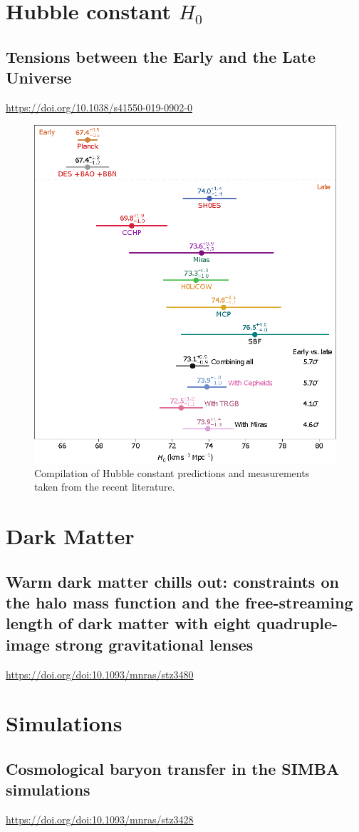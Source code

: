 \section{Hubble constant $H_0$}

\subsection*{Tensions between the Early and the Late Universe}
\url{https://doi.org/10.1038/s41550-019-0902-0}
\begin{figure}[H]
    \centering
    \includegraphics[width=.85 \textwidth]{Pictures/99/Tensions.eps}
    \caption{Compilation of Hubble constant predictions and measurements taken from the recent
    literature.}
\end{figure}



\section{Dark Matter}

\subsection*{Warm dark matter chills out: constraints on the halo mass function and the free-streaming length of dark matter with eight quadruple-image strong gravitational lenses}
\url{https://doi.org/doi:10.1093/mnras/stz3480}



\section{Simulations}


\subsection*{Cosmological baryon transfer in the SIMBA simulations}
\url{https://doi.org/doi:10.1093/mnras/stz3428}